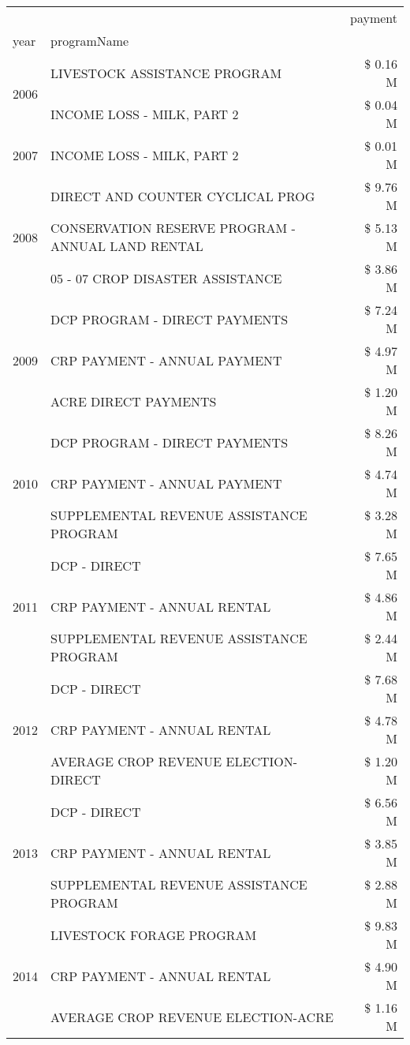 \begin{tabular}{llr}
\toprule
 &  & payment \\
year & programName &  \\
\midrule
\multirow[t]{2}{*}{2006} & LIVESTOCK ASSISTANCE PROGRAM & \$ 0.16 M \\
 & INCOME LOSS - MILK, PART 2 & \$ 0.04 M \\
\cline{1-3}
2007 & INCOME LOSS - MILK, PART 2 & \$ 0.01 M \\
\cline{1-3}
\multirow[t]{3}{*}{2008} & DIRECT AND COUNTER CYCLICAL PROG & \$ 9.76 M \\
 & CONSERVATION RESERVE PROGRAM - ANNUAL LAND RENTAL & \$ 5.13 M \\
 & 05 - 07 CROP DISASTER ASSISTANCE & \$ 3.86 M \\
\cline{1-3}
\multirow[t]{3}{*}{2009} & DCP PROGRAM - DIRECT PAYMENTS & \$ 7.24 M \\
 & CRP PAYMENT - ANNUAL PAYMENT & \$ 4.97 M \\
 & ACRE DIRECT PAYMENTS & \$ 1.20 M \\
\cline{1-3}
\multirow[t]{3}{*}{2010} & DCP PROGRAM - DIRECT PAYMENTS & \$ 8.26 M \\
 & CRP PAYMENT - ANNUAL PAYMENT & \$ 4.74 M \\
 & SUPPLEMENTAL REVENUE ASSISTANCE PROGRAM & \$ 3.28 M \\
\cline{1-3}
\multirow[t]{3}{*}{2011} & DCP - DIRECT & \$ 7.65 M \\
 & CRP PAYMENT - ANNUAL RENTAL & \$ 4.86 M \\
 & SUPPLEMENTAL REVENUE ASSISTANCE PROGRAM & \$ 2.44 M \\
\cline{1-3}
\multirow[t]{3}{*}{2012} & DCP - DIRECT & \$ 7.68 M \\
 & CRP PAYMENT - ANNUAL RENTAL & \$ 4.78 M \\
 & AVERAGE CROP REVENUE ELECTION-DIRECT & \$ 1.20 M \\
\cline{1-3}
\multirow[t]{3}{*}{2013} & DCP - DIRECT & \$ 6.56 M \\
 & CRP PAYMENT - ANNUAL RENTAL & \$ 3.85 M \\
 & SUPPLEMENTAL REVENUE ASSISTANCE PROGRAM & \$ 2.88 M \\
\cline{1-3}
\multirow[t]{3}{*}{2014} & LIVESTOCK FORAGE PROGRAM & \$ 9.83 M \\
 & CRP PAYMENT - ANNUAL RENTAL & \$ 4.90 M \\
 & AVERAGE CROP REVENUE ELECTION-ACRE & \$ 1.16 M \\
\cline{1-3}

\end{tabular}
